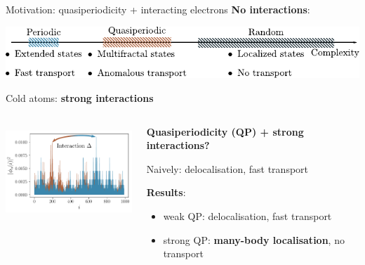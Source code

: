 \begin{frame}{Motivation: quasiperiodicity + interacting electrons}
\textbf{No interactions}:

{
\centering
\includegraphics[width=\textwidth]{img/1_motivation/complexity.pdf}

}

Cold atoms: \textbf{strong interactions}

\begin{columns}
\begin{column}{0.4\textwidth}
\centering
\includegraphics[height=3.5cm]{img/0_cover/free_two_densities_interaction}
\end{column}
\begin{column}{0.6\textwidth}
\textbf{Quasiperiodicity (QP) + strong interactions?}

Naively: delocalisation, fast transport

\textbf{Results}: 
\begin{itemize}
	\item weak QP: delocalisation, fast transport
	\item strong QP: \textbf{many-body localisation}, no transport
\end{itemize}
\end{column}
\end{columns}
\end{frame}
